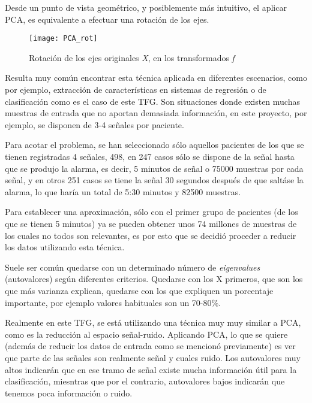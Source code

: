 Desde un punto de vista geométrico, y posiblemente más intuitivo, el aplicar PCA, es equivalente a efectuar una rotación de los ejes.

\begin{figure}[h]
	\centering
	\texttt{[image: PCA\_rot]}
	\caption{Rotación de los ejes originales \textit{X}, en los transformados \textit{f}}
	\label{fig:rotacion}
\end{figure}
\par 
Resulta muy común encontrar esta técnica aplicada en diferentes escenarios, como por ejemplo, extracción de características en sistemas de regresión o de clasificación como es el caso de este TFG. Son situaciones donde existen muchas muestras de entrada que no aportan demasiada información, en este proyecto, por ejemplo, se disponen de 3-4 señales por paciente.\par 
Para acotar el problema, se han seleccionado sólo aquellos pacientes de los que se tienen registradas 4 señales, 498, en 247 casos sólo se dispone de la señal hasta que se produjo la alarma, es decir, 5 minutos de señal o 75000 muestras por cada señal, y en otros 251 casos se tiene la señal 30 segundos después de que saltáse la alarma, lo que haría un total de 5:30 minutos y 82500 muestras.\par 
Para establecer una aproximación, sólo con el primer grupo de pacientes (de los que se tienen 5 minutos) ya se pueden obtener unos 74 millones de muestras de los cuales no todos son relevantes, es por esto que se decidió proceder a reducir los datos utilizando esta técnica.

Suele ser común quedarse con un determinado número de \textit{eigenvalues} (autovalores) según diferentes criterios. Quedarse con los X primeros, que son los que más varianza explican, quedarse con los que expliquen un porcentaje importante, por ejemplo valores habituales son un 70-80\%. \par 

Realmente en este TFG, se está utilizando una técnica muy muy similar a PCA, como es la reducción al espacio señal-ruido. Aplicando PCA, lo que se quiere (además de reducir los datos de entrada como se mencionó previamente) es ver que parte de las señales son realmente señal y cuales ruido. Los autovalores muy altos indicarán que en ese tramo de señal existe mucha información útil para la clasificación, miesntras que por el contrario, autovalores bajos indicarán que tenemos poca información o ruido.\par 

